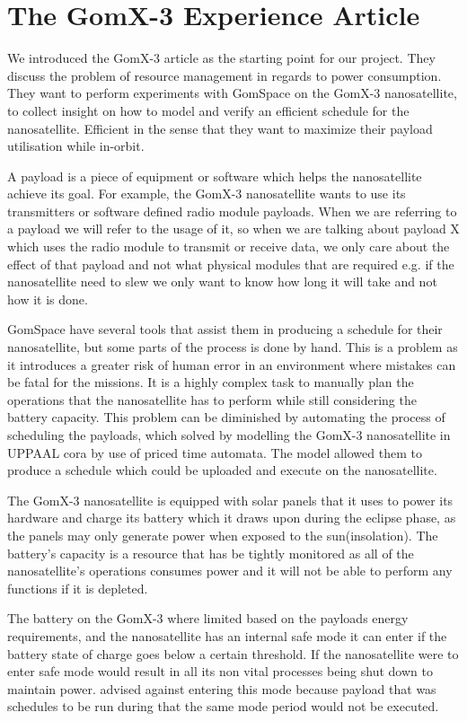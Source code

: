 \section{The GomX-3 Experience Article}
We introduced the GomX-3 article as the starting point for our project. They discuss the problem of resource management in regards to power consumption. They want to perform experiments with GomSpace on the GomX-3 nanosatellite, to collect insight on how to model and verify an efficient schedule for the nanosatellite. Efficient in the sense that they want to maximize their payload utilisation while in-orbit. 

A payload is a piece of equipment or software which helps the nanosatellite achieve its goal. For example, the GomX-3 nanosatellite wants to use its transmitters or software defined radio module payloads. When we are referring to a payload we will refer to the usage of it, so when we are talking about payload X which uses the radio module to transmit or receive data, we only care about the effect of that payload and not what physical modules that are required e.g. if the nanosatellite need to slew we only want to know how long it will take and not how it is done.

GomSpace have several tools that assist them in producing a schedule for their nanosatellite, but some parts of the process is done by hand. This is a problem as it introduces a greater risk of human error in an environment where mistakes can be fatal for the missions. It is a highly complex task to manually plan the operations that the nanosatellite has to perform while still considering the battery capacity. This problem can be diminished by automating the process of scheduling the payloads, which \cite{gomx3} solved by modelling the GomX-3 nanosatellite in UPPAAL \gls{cora} by use of priced time automata. The model allowed them to produce a schedule which could be uploaded and execute on the nanosatellite.

The GomX-3 nanosatellite is equipped with solar panels that it uses to power its hardware and charge its battery which it draws upon during the eclipse phase, as the panels may only generate power when exposed to the sun(insolation). The battery's capacity is a resource that has be tightly monitored as all of the nanosatellite's operations consumes power and it will not be able to perform any functions if it is depleted.\cite{gomx3}

The battery on the GomX-3 where limited based on the payloads energy requirements, and the nanosatellite has an internal safe mode it can enter if the battery state of charge goes below a certain threshold. If the nanosatellite were to enter safe mode would result in all its non vital processes being shut down to maintain power. \cite{gomx3} advised against entering this mode because payload that was schedules to be run during that the same mode period would not be executed.


